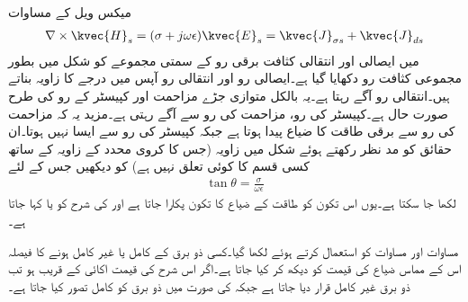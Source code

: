 میکس ویل کے مساوات
\begin{align*}
\nabla \times \kvec{H}_s=(\sigma+j\omega \epsilon)\kvec{E}_s=\kvec{J}_{\sigma s}+\kvec{J}_{d s}
\end{align*}
میں ایصالی اور انتقالی کثافت برقی رو کے سمتی مجموعے کو شکل  میں بطور مجموعی کثافت رو  دکھایا گیا ہے۔ایصالی رو اور انتقالی رو آپس میں  درجے کا زاویہ بناتے ہیں۔انتقالی رو  آگے رہتا ہے۔یہ بالکل متوازی جڑے مزاحمت اور کپیسٹر کے رو کی طرح صورت حال ہے۔کپیسٹر کی رو، مزاحمت کی رو سے   آگے رہتی ہے۔مزید یہ کہ مزاحمت کی رو سے برقی طاقت  کا ضیاع پیدا ہوتا ہے جبکہ کپیسٹر کی رو سے ایسا نہیں ہوتا۔ان حقائق کو مد نظر رکھتے ہوئے  شکل  میں زاویہ  (جس کا کروی محدد کے زاویہ  کے ساتھ کسی قسم کا کوئی تعلق نہیں ہے) کو دیکھیں جس کے لئے
\begin{align}
\tan \theta=\frac{\sigma}{\omega \epsilon}
\end{align}
لکھا جا سکتا ہے۔یوں اس تکون کو طاقت کے ضیاع کا تکون پکارا جاتا ہے اور  کی شرح کو  یا کہا جاتا ہے۔

مساوات  اور مساوات  کو  استعمال کرتے ہوئے لکھا گیا۔کسی ذو برق کے کامل یا غیر کامل ہونے کا فیصلہ اس کے مماس ضیاع کی قیمت کو دیکھ کر کیا جاتا ہے۔اگر اس شرح کی قیمت اکائی کے قریب ہو تب ذو برق غیر کامل قرار دیا جاتا ہے جبکہ  کی صورت میں ذو برق کو کامل تصور کیا جاتا ہے۔

